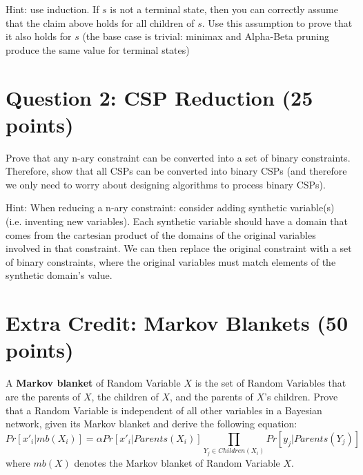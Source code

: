 \documentclass[11pt]{article}
\newcommand{\question}[1]{\section*{\normalsize #1}}
\begin{document}
\noindent Hint: use induction. If $s$ is not a terminal state, then you can correctly assume that the claim above holds for all children of $s$. Use this assumption to prove that it also holds for $s$ (the base case is trivial: minimax and Alpha-Beta pruning produce the same value for terminal states)\newpage





\question{Question 2: CSP Reduction (25 points)}
Prove that any n-ary constraint can be converted into a set of binary constraints. Therefore, show that all CSPs can be converted into binary CSPs (and therefore we only need to worry about designing algorithms to process binary CSPs).\newline\newline\newline

\noindent Hint: When reducing a n-ary constraint: consider adding synthetic variable(s) (i.e. inventing new variables). Each synthetic variable should have a domain that comes from the cartesian product of the domains of the original variables involved in that constraint. We can then replace the original constraint with a set of binary constraints, where the original variables must match elements of the synthetic domain's value.
\newpage






\question{Extra Credit: Markov Blankets (50 points)}
A \textbf{Markov blanket} of Random Variable $X$ is the set of Random Variables that are the parents of $X$, the children of $X$, and the parents of $X$'s children. Prove that a Random Variable is independent of all other variables in a Bayesian network, given its Markov blanket and derive the following equation:
$$Pr[x'_i | mb(X_i)] = \alpha Pr[x'_i | Parents(X_i)]\prod\limits_{Y_j\in Children(X_i)} Pr[y_j | Parents(Y_j)]$$
where $mb(X)$ denotes the Markov blanket of Random Variable $X$.
\end{document}

